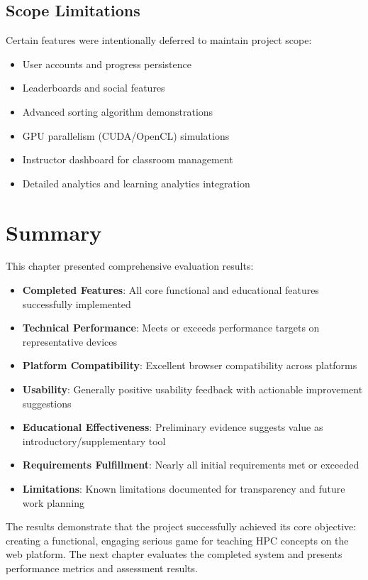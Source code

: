 \subsection{Scope Limitations}
\label{subsec:scope-limitations}

Certain features were intentionally deferred to maintain project scope:

\begin{itemize}
    \item User accounts and progress persistence
    \item Leaderboards and social features
    \item Advanced sorting algorithm demonstrations
    \item GPU parallelism (CUDA/OpenCL) simulations
    \item Instructor dashboard for classroom management
    \item Detailed analytics and learning analytics integration
\end{itemize}

\section{Summary}
\label{sec:results-summary}

This chapter presented comprehensive evaluation results:

\begin{itemize}
    \item \textbf{Completed Features}: All core functional and educational features successfully implemented
    \item \textbf{Technical Performance}: Meets or exceeds performance targets on representative devices
    \item \textbf{Platform Compatibility}: Excellent browser compatibility across platforms
    \item \textbf{Usability}: Generally positive usability feedback with actionable improvement suggestions
    \item \textbf{Educational Effectiveness}: Preliminary evidence suggests value as introductory/supplementary tool
    \item \textbf{Requirements Fulfillment}: Nearly all initial requirements met or exceeded
    \item \textbf{Limitations}: Known limitations documented for transparency and future work planning
\end{itemize}

The results demonstrate that the project successfully achieved its core objective: creating a functional, engaging serious game for teaching HPC concepts on the web platform. The next chapter evaluates the completed system and presents performance metrics and assessment results.